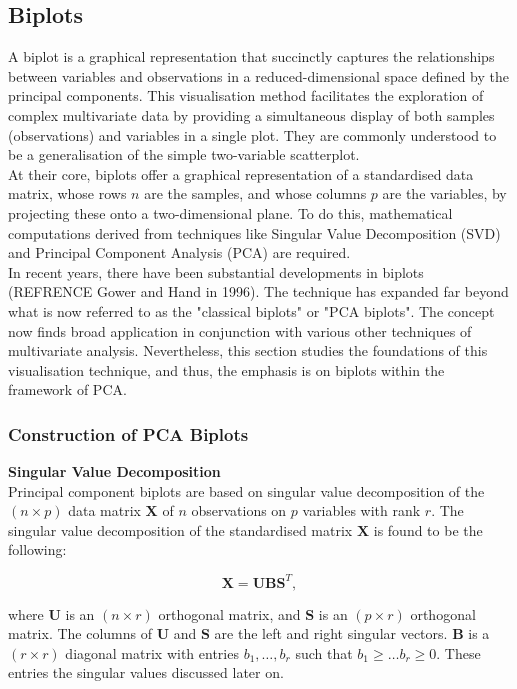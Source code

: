 \documentclass{article}\usepackage[]{graphicx}\usepackage[]{xcolor}
\numberwithin{equation}{section}
\begin{document}
{\subsection{Biplots}
\noindent 
A biplot is a graphical representation that succinctly captures the relationships between variables and observations in a reduced-dimensional space defined by the principal components. This visualisation method facilitates the exploration of complex multivariate data by providing a simultaneous display of both samples (observations) and variables in a single plot. They are commonly understood to be a generalisation of the simple two-variable scatterplot.\\

\noindent At their core, biplots offer a graphical representation of a standardised data matrix, whose rows \(n\) are the samples, and whose columns \(p\) are the variables, by projecting these onto a two-dimensional plane. To do this, mathematical computations derived from techniques like Singular Value Decomposition (SVD) and Principal Component Analysis (PCA) are required.\\

\noindent In recent years, there have been substantial developments in biplots (REFRENCE Gower and Hand in 1996). The technique has expanded far beyond what is now referred to as the "classical biplots" or "PCA biplots". The concept now finds broad application in conjunction with various other techniques of multivariate analysis. Nevertheless, this section studies the foundations of this visualisation technique, and thus, the emphasis is on biplots within the framework of PCA.

\subsubsection{Construction of PCA Biplots}

\noindent \textbf{Singular Value Decomposition}\\
\noindent Principal component biplots are based on singular value decomposition of the $(n \times p)$ data matrix $\mathbf{X}$ of $n$ observations on $p$ variables with rank $r$. The singular value decomposition of the standardised matrix $\mathbf{X}$ is found to be the following:

\[\mathbf{X} = \mathbf{U}\mathbf{B}\mathbf{S}^{T}, \]

\noindent where $\mathbf{U}$ is an $(n \times r)$ orthogonal matrix, and $\mathbf{S}$ is an $(p \times r)$ orthogonal matrix. The columns of $\mathbf{U}$ and $\mathbf{S}$ are the left and right singular vectors. $\mathbf{B}$ is a $(r \times r)$ diagonal matrix with entries $b_1, \ldots, b_r$ such that $b_1 \geq \dots b_r \geq 0$. These entries the singular values discussed later on. %

}
\end{document}
